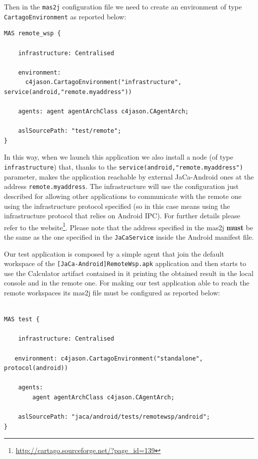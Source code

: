 \documentclass[11pt]{report}
\newcommand\code[1]{{\mbox{\texttt{{#1}}}}}
\newcommand{\cartago}{\mbox{\sf{CArtAgO}}}
\newcommand{\jacandroid}{\textsf{JaCa-Android}}
\begin{document}
\noindent Then in the \code{mas2j} configuration file we need to create an environment of type \code{CartagoEnvironment} as reported below:
%
%
{\scriptsize \begin{verbatim}
MAS remote_wsp {
	
	infrastructure: Centralised

    environment: 
      c4jason.CartagoEnvironment("infrastructure", service(android,"remote.myaddress"))

    agents: agent agentArchClass c4jason.CAgentArch;

    aslSourcePath: "test/remote";
}
\end{verbatim}}
%
\noindent In this way, when we launch this application we also install a \cartago{} node (of type \code{infrastructure}) that, thanks to the \code{service(android,"remote.myaddress")} parameter, makes the application reachable by external \jacandroid{} ones at the address \code{remote.myaddress}. The \cartago{} infrastructure will use the configuration just described for allowing other applications to communicate with the remote one using the infrastructure protocol specified (so in this case means using the \cartago{} infrastructure protocol that relies on Android IPC). For further details please refer to the \cartago{} website\footnote{\url{http://cartago.sourceforge.net/?page_id=139}}.
%
Please note that the address specified in the \textsf{mas2j} \textbf{must} be the same as the one specified in the \code{JaCaService} inside the Android manifest file.


Our test application is composed by a simple agent that join the default workspace of the \code{[JaCa-Android]RemoteWsp.apk} application and then starts to use the \textsf{Calculator} artifact contained in it printing the obtained result in the local console and in the remote one. For making our test application able to reach the remote workspaces its \textsf{mas2j} file must be configured as reported below:

{\scriptsize \begin{verbatim}

MAS test {
	
	infrastructure: Centralised

   environment: c4jason.CartagoEnvironment("standalone", protocol(android))

    agents:  
   		agent agentArchClass c4jason.CAgentArch;

    aslSourcePath: "jaca/android/tests/remotewsp/android";
}
\end{verbatim}}
\end{document}
